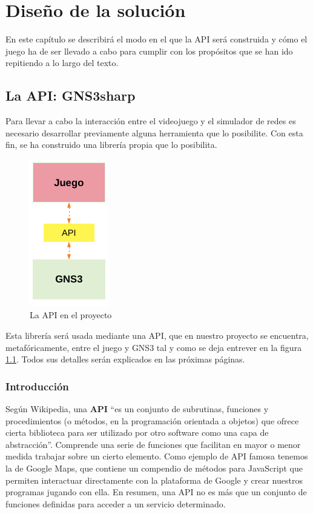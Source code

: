 \chapter{Diseño de la solución}\label{chap:Design}
En este capítulo se describirá el modo en el que la API será construida y cómo el juego ha de ser llevado a cabo para cumplir con los propósitos que se han ido repitiendo a lo largo del texto.

\section{La API: GNS3sharp}\label{sec:dis_api}
Para llevar a cabo la interacción entre el videojuego y el simulador de redes es necesario desarrollar previamente alguna herramienta que lo posibilite. Con esta fin, se ha construido una librería propia que lo posibilita.

\begin{figure}[H]
  \centering
  \includegraphics[scale=1.4]{imagenes/capa_api}
  \caption{La API en el proyecto}
  \label{fig:capa_api}
\end{figure}

Esta librería será usada mediante una API, que en nuestro proyecto se encuentra, metafóricamente, entre el juego y GNS3 tal y como se deja entrever en la figura \ref{fig:capa_api}. Todos sus detalles serán explicados en las próximas páginas.

\subsection{Introducción}\label{subsec:sectionapi}
Según Wikipedia, una \textbf{API} ``es un conjunto de subrutinas, funciones y procedimientos (o métodos, en la programación orientada a objetos) que ofrece cierta biblioteca para ser utilizado por otro software como una capa de abstracción''\cite{wiki:api}. Comprende una serie de funciones que facilitan en mayor o menor medida trabajar sobre un cierto elemento. Como ejemplo de API famosa tenemos la de Google Maps, que contiene un compendio de métodos para JavaScript que permiten interactuar directamente con la plataforma de Google y crear nuestros programas jugando con ella\cite{googlemaps}. En resumen, una API no es más que un conjunto de funciones definidas para acceder a un servicio determinado.

